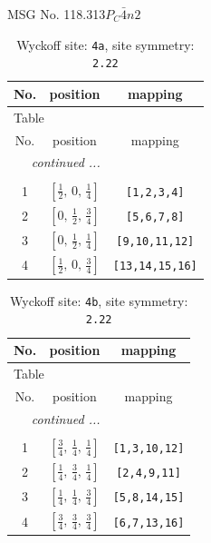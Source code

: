 \documentclass[fleqn,8pt]{jsarticle}
\begin{document}
\setcounter{MaxMatrixCols}{32}

\renewcommand{\tablename}{Table~}
\renewcommand{\figurename}{Figure~}
\begin{center}
\LARGE
MSG No. 118.313\quad$P_{C}\bar{4}n2$
\end{center}
\renewcommand{\arraystretch}{1.2}
\begin{longtable}{ccc}
\caption{Wyckoff site: {\tt 4a}, site symmetry: {\tt 2.22}}
 \\
 \hline \hline
No. & position & mapping \\ \hline \endfirsthead

\multicolumn{2}{l}{\tablename\ \thetable{}} \\
 \hline \hline
No. & position & mapping \\ \hline \endhead

 \hline \hline
\multicolumn{2}{r}{\footnotesize\it continued ...} \\ \endfoot

 \hline \hline
\multicolumn{2}{r}{} \\ \endlastfoot

1 & $\left[ \frac{1}{2},\, 0,\, \frac{1}{4} \right]$ & {\tt [1,2,3,4]} \\ \hline
2 & $\left[ 0,\, \frac{1}{2},\, \frac{3}{4} \right]$ & {\tt [5,6,7,8]} \\ \hline
3 & $\left[ 0,\, \frac{1}{2},\, \frac{1}{4} \right]$ & {\tt [9,10,11,12]} \\ \hline
4 & $\left[ \frac{1}{2},\, 0,\, \frac{3}{4} \right]$ & {\tt [13,14,15,16]} \\
\end{longtable}
\renewcommand{\arraystretch}{1.2}
\begin{longtable}{ccc}
\caption{Wyckoff site: {\tt 4b}, site symmetry: {\tt 2.22}}
 \\
 \hline \hline
No. & position & mapping \\ \hline \endfirsthead

\multicolumn{2}{l}{\tablename\ \thetable{}} \\
 \hline \hline
No. & position & mapping \\ \hline \endhead

 \hline \hline
\multicolumn{2}{r}{\footnotesize\it continued ...} \\ \endfoot

 \hline \hline
\multicolumn{2}{r}{} \\ \endlastfoot

1 & $\left[ \frac{3}{4},\, \frac{1}{4},\, \frac{1}{4} \right]$ & {\tt [1,3,10,12]} \\ \hline
2 & $\left[ \frac{1}{4},\, \frac{3}{4},\, \frac{1}{4} \right]$ & {\tt [2,4,9,11]} \\ \hline
3 & $\left[ \frac{1}{4},\, \frac{1}{4},\, \frac{3}{4} \right]$ & {\tt [5,8,14,15]} \\ \hline
4 & $\left[ \frac{3}{4},\, \frac{3}{4},\, \frac{3}{4} \right]$ & {\tt [6,7,13,16]} \\
\end{longtable}
\end{document}
